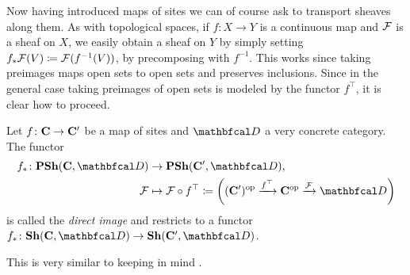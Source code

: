 Now having introduced maps of sites we can of course ask to transport sheaves along them. As with topological spaces, if $f\colon X\to Y$ is a continuous map and ${\mathcal{F}}$ is a sheaf on $X$, we easily obtain a sheaf on $Y$ by simply setting $f_\ast{\mathcal{F}}(V) \coloneqq {\mathcal{F}}(f^{-1}(V))$, \ie by precomposing with $f^{-1}$. This works since taking preimages maps open sets to open sets and preserves inclusions. Since in the general case taking preimages of open sets is modeled by the functor $f^\top$, it is clear how to proceed.
\begin{lemma}
	
	Let $f\colon {{\mathbf{C}}}\to {{\mathbf{C}}}'$ be a map of sites and $\category D$ a very concrete category. The functor
	\begin{align*}
		f_\ast \colon \Presheaves{\site C}{\category D} &\to \Presheaves{\site C'}{\category D},\\
		\sheaf F &\mapsto \sheaf F\circ f^\top \ldef \left((\site C')^\op \xrightarrow{f^\top}\site C^\op\xrightarrow{\sheaf F} \category D\right)
	\end{align*}
	is called the \emph{direct image} and restricts to a functor $f_\ast \colon \Sheaves{\site C}{\category D} \to \Sheaves{\site C'}{\category D}$.
\end{lemma}
\begin{shortproof}
	This is very similar to \cite[Lem. C2.3.3]{elephant2} keeping in mind \cite[Rem. C2.3.7]{elephant2}.
\end{shortproof}

